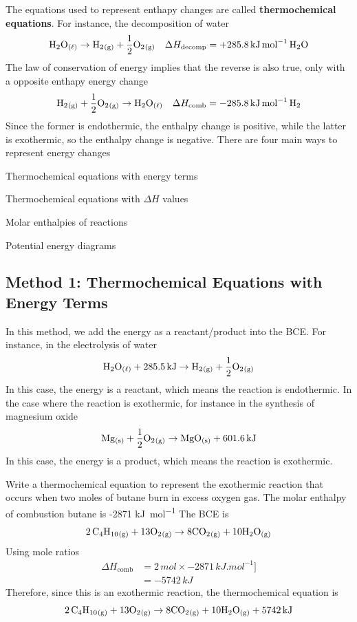 The equations used to represent enthapy changes are called \textbf{thermochemical equations}.
For instance, the decomposition of water
\[
    \ch{H2O_{(\ell)}}\to \ch{H2_{(g)}}+\frac{1}{2}\ch{O2_{(g)}}\quad\Delta H_\text{decomp}=+285.8\,\si{kJ.mol^{-1}}\,\ch{H2O}
\]
The law of conservation of energy implies that the reverse is also true, only with a opposite
enthapy energy change
\[
    \ch{H2_{(g)}}+\frac{1}{2}\ch{O2_{(g)}}\to \ch{H2O_{(\ell)}}\quad\Delta H_\text{comb}=-285.8\,\si{kJ.mol^{-1}}\,\ch{H2}
\]
Since the former is endothermic, the enthalpy change is positive, while the latter is exothermic,
so the enthalpy change is negative. There are four main ways to represent energy changes
\begin{enum}
    \item Thermochemical equations with energy terms
    \item Thermochemical equations with $\Delta H$ values
    \item Molar enthalpies of reactions
    \item Potential energy diagrams
\end{enum}

\subsection{Method 1: Thermochemical Equations with Energy Terms}
In this method, we add the energy as a reactant/product into the BCE. For instance,
in the electrolysis of water 
\[
    \ch{H2O_{(\ell)}}+285.5\,\si{kJ}\to \ch{H2_{(g)}}+\frac{1}{2}\ch{O2_{(g)}}
\]
In this case, the energy is a reactant, which means the reaction is endothermic. In the case where
the reaction is exothermic, for instance in the synthesis of magnesium oxide
\[
    \ch{Mg_{(s)}}+\frac{1}{2}\ch{O2_{(g)}}\to \ch{MgO_{(s)}}+601.6\,\si{kJ}
\]
In this case, the energy is a product, which means the reaction is exothermic.

\begin{sample}{Write a thermochemical equation to represent the exothermic reaction that occurs
    when two moles of butane burn in excess oxygen gas. The molar enthalpy of combustion butane
    is -2871 \si{kJ.mol^{-1}}}
    The BCE is
    \[
        \ch{2C4H10_{(g)}}+13\ch{O2_{(g)}}\to 8 \ch{CO2_{(g)}}+10 \ch{H2O_{(g)}}
    \]
    Using mole ratios
    \begin{align*}
        \Delta H_\text{comb}&=2\,\si{mol}\times-2871\,\si{kJ.mol^{-1}}]\\
                            &=-5742\,\si{kJ}
    \end{align*}
    Therefore, since this is an exothermic reaction, the thermochemical equation is
    \[
        \ch{2C4H10_{(g)}}+13\ch{O2_{(g)}}\to 8 \ch{CO2_{(g)}}+10 \ch{H2O_{(g)}}+5742\,\si{kJ}
    \]
\end{sample}

